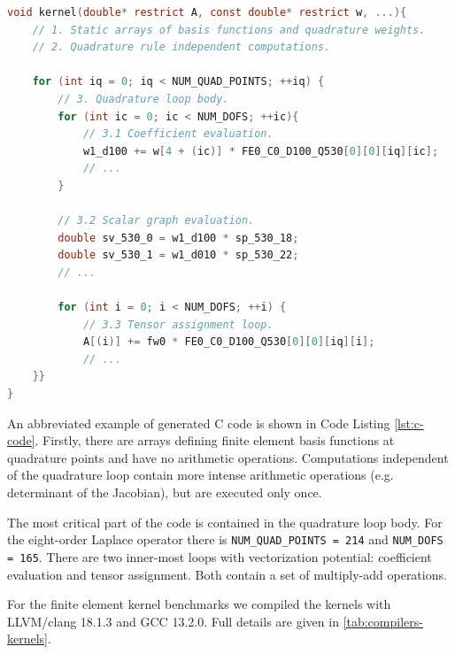 \lstset{style=CStyle}
\begin{lstlisting}[language=c,
    caption=Abbreviated FFCx generated finite element kernel.,
    basicstyle=\ttfamily\footnotesize,
    keywordstyle=\ttb\color{deepblue}\footnotesize,
    label=lst:c-code]
void kernel(double* restrict A, const double* restrict w, ...){
    // 1. Static arrays of basis functions and quadrature weights.
    // 2. Quadrature rule independent computations.

    for (int iq = 0; iq < NUM_QUAD_POINTS; ++iq) {
        // 3. Quadrature loop body.
        for (int ic = 0; ic < NUM_DOFS; ++ic){
            // 3.1 Coefficient evaluation.
            w1_d100 += w[4 + (ic)] * FE0_C0_D100_Q530[0][0][iq][ic];
            // ...
        }

        // 3.2 Scalar graph evaluation.
        double sv_530_0 = w1_d100 * sp_530_18;
        double sv_530_1 = w1_d010 * sp_530_22;
        // ...

        for (int i = 0; i < NUM_DOFS; ++i) {
            // 3.3 Tensor assignment loop.
            A[(i)] += fw0 * FE0_C0_D100_Q530[0][0][iq][i];
            // ...
    }}
}
\end{lstlisting}

An abbreviated example of generated C code is shown in Code Listing
\ref{lst:c-code}. Firstly, there are arrays defining finite element basis
functions at quadrature points and have no arithmetic operations. Computations
independent of the quadrature loop contain more intense arithmetic operations
(e.g. determinant of the Jacobian), but are executed only once.

The most critical part of the code is contained in the quadrature loop body. For
the eight-order Laplace operator there is \lstinline{NUM_QUAD_POINTS = 214} and
\lstinline{NUM_DOFS = 165}. There are two inner-most loops with vectorization
potential: coefficient evaluation and tensor assignment. Both contain a set of
multiply-add operations.

For the finite element kernel benchmarks we compiled the kernels with
LLVM/clang 18.1.3 and GCC 13.2.0. Full details are given in
\autoref{tab:compilers-kernels}.

